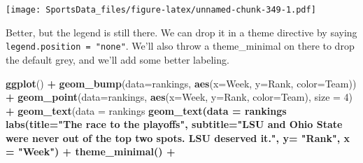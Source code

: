 \documentclass[]{book}
\newenvironment{Shaded}{\begin{snugshade}}{\end{snugshade}}
\newcommand{\DataTypeTok}[1]{\textcolor[rgb]{0.13,0.29,0.53}{#1}}
\newcommand{\DecValTok}[1]{\textcolor[rgb]{0.00,0.00,0.81}{#1}}
\newcommand{\FloatTok}[1]{\textcolor[rgb]{0.00,0.00,0.81}{#1}}
\newcommand{\KeywordTok}[1]{\textcolor[rgb]{0.13,0.29,0.53}{\textbf{#1}}}
\newcommand{\NormalTok}[1]{#1}
\newcommand{\OperatorTok}[1]{\textcolor[rgb]{0.81,0.36,0.00}{\textbf{#1}}}
\newcommand{\StringTok}[1]{\textcolor[rgb]{0.31,0.60,0.02}{#1}}
\begin{document}
\texttt{[image: SportsData\_files/figure-latex/unnamed-chunk-349-1.pdf]}

Better, but the legend is still there. We can drop it in a theme directive by saying \texttt{legend.position\ =\ "none"}. We'll also throw a theme\_minimal on there to drop the default grey, and we'll add some better labeling.

\begin{Shaded}
\begin{Highlighting}[]
\KeywordTok{ggplot}\NormalTok{() }\OperatorTok{+}\StringTok{ }
\StringTok{  }\KeywordTok{geom_bump}\NormalTok{(}\DataTypeTok{data=}\NormalTok{rankings, }\KeywordTok{aes}\NormalTok{(}\DataTypeTok{x=}\NormalTok{Week, }\DataTypeTok{y=}\NormalTok{Rank, }\DataTypeTok{color=}\NormalTok{Team)) }\OperatorTok{+}\StringTok{ }
\StringTok{  }\KeywordTok{geom_point}\NormalTok{(}\DataTypeTok{data=}\NormalTok{rankings, }\KeywordTok{aes}\NormalTok{(}\DataTypeTok{x=}\NormalTok{Week, }\DataTypeTok{y=}\NormalTok{Rank, }\DataTypeTok{color=}\NormalTok{Team), }\DataTypeTok{size =} \DecValTok{4}\NormalTok{) }\OperatorTok{+}\StringTok{   }
\StringTok{  }\KeywordTok{geom_text}\NormalTok{(}\DataTypeTok{data =}\NormalTok{ rankings }\OperatorTok{%
\StringTok{  }\KeywordTok{geom_text}\NormalTok{(}\DataTypeTok{data =}\NormalTok{ rankings }\OperatorTok{%
\StringTok{  }\KeywordTok{labs}\NormalTok{(}\DataTypeTok{title=}\StringTok{"The race to the playoffs"}\NormalTok{, }\DataTypeTok{subtitle=}\StringTok{"LSU and Ohio State were never out of the top two spots. LSU deserved it."}\NormalTok{, }\DataTypeTok{y=} \StringTok{"Rank"}\NormalTok{, }\DataTypeTok{x =} \StringTok{"Week"}\NormalTok{) }\OperatorTok{+}
\StringTok{  }\KeywordTok{theme_minimal}\NormalTok{() }\OperatorTok{+}
}}
\end{Highlighting}
\end{Shaded}
\end{document}
